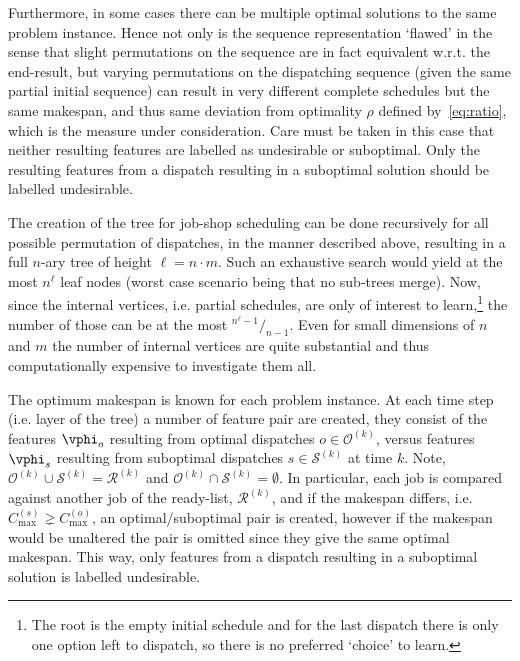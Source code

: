 \documentclass{svjour3}                     %
\begin{document}
Furthermore, in some cases there can be multiple optimal solutions to the same problem instance. Hence not only is the 
sequence representation `flawed' in the sense that slight permutations on the sequence are in fact equivalent w.r.t. 
the end-result, but varying permutations on the dispatching sequence (given the same partial initial sequence) can 
result in very different complete schedules but the same makespan, and thus same deviation from optimality $\rho$ 
defined by~\eqref{eq:ratio}, which is the measure under consideration. Care must be taken in this case that neither 
resulting features are labelled as undesirable or suboptimal. Only the resulting features from a dispatch resulting in 
a suboptimal solution should be labelled undesirable. 

The creation of the tree for job-shop scheduling can be done recursively for all possible permutation of dispatches, 
in the manner described above, resulting in a full \mbox{$n$-ary} tree %
of height $\ell=n\cdot m$. Such an exhaustive search would yield at the most $n^{\ell}$ leaf nodes (worst case scenario being that no sub-trees merge). Now, since the internal vertices, i.e. partial schedules, are only of interest to learn,\footnote{The root is the empty initial schedule and for the last dispatch there is only one option left to dispatch, so there is no preferred `choice' to learn.} the number of those can be at the most \mbox{${}^{n^{\ell}-1}/_{n-1}$}.
Even for small dimensions of $n$ and $m$ the number of internal vertices are quite substantial and thus 
computationally expensive to investigate them all. 



The optimum makespan is known for each problem instance. 
At each time step (i.e. layer of the tree) a number of feature pair are created, they consist of the features 
$\vphi_o$ resulting from optimal dispatches $o\in\mathcal{O}^{(k)}$, versus features $\vphi_s$ resulting from 
suboptimal dispatches $s\in\mathcal{S}^{(k)}$ at time $k$. Note, 
$\mathcal{O}^{(k)}\cup\mathcal{S}^{(k)}=\mathcal{R}^{(k)}$ and $\mathcal{O}^{(k)}\cap\mathcal{S}^{(k)}=\emptyset$.
In particular, each job is compared against another job of the ready-list, $\mathcal{R}^{(k)}$, and if the makespan differs, i.e. $C_{\max}^{(s)}\gneq C_{\max}^{(o)}$, an optimal/suboptimal pair is created, however if the makespan would be unaltered the pair is omitted since they give the same optimal makespan. This way, only features from a dispatch resulting in a suboptimal solution is labelled undesirable.
\end{document}
